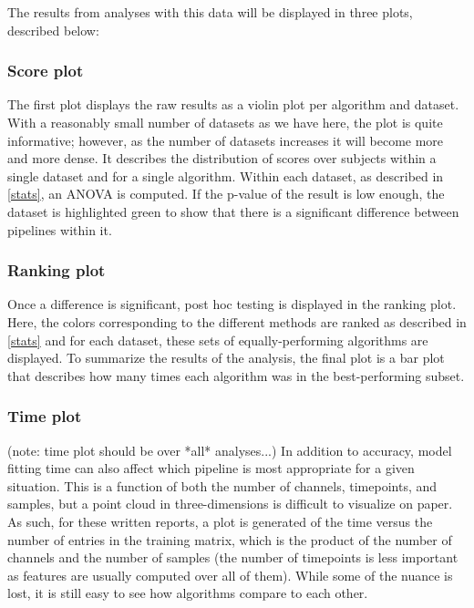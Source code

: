 The results from analyses with this data will be displayed in three plots, described below:

\subsubsection{Score plot}
The first plot displays the raw results as a violin plot per algorithm and
dataset. With a reasonably small number of datasets as we have here, the plot is
quite informative; however, as the number of datasets increases it will become
more and more dense. It describes the distribution of scores over subjects
within a single dataset and for a single algorithm. Within each dataset, as
described in \ref{stats}, an ANOVA is computed. If the p-value of the result is
low enough, the dataset is highlighted green to show that there is a significant
difference between pipelines within it.

\subsubsection{Ranking plot}
Once a difference is significant, post hoc testing is displayed in the ranking
plot. Here, the colors corresponding to the different methods are ranked as
described in \ref{stats} and for each dataset, these sets of equally-performing
algorithms are displayed. To summarize the results of the analysis, the
final plot is a bar plot that describes how many times each algorithm was in the
best-performing subset.

\subsubsection{Time plot}
(note: time plot should be over *all* analyses...)  In addition to accuracy,
model fitting time can also affect which pipeline is most appropriate for a
given situation. This is a function of both the number of channels, timepoints,
and samples, but a point cloud in three-dimensions is difficult to visualize on
paper. As such, for these written reports, a plot is generated of the time
versus the number of entries in the training matrix, which is the product of the
number of channels and the number of samples (the number of timepoints is less
important as features are usually computed over all of them). While some of the
nuance is lost, it is still easy to see how algorithms compare to each other.

